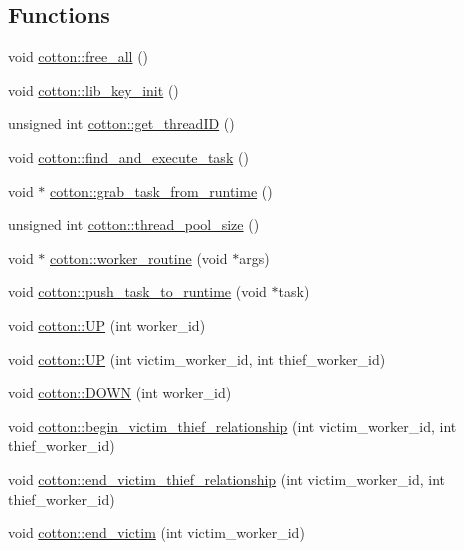 \subsection*{Functions}
\begin{DoxyCompactItemize}
\item 
void \mbox{\hyperlink{cotton-runtime_8h_ad169fe95f5f03bdfa569dd365dde6c12}{cotton\+::free\+\_\+all}} ()
\item 
void \mbox{\hyperlink{cotton-runtime_8h_a4ea9036584fa3bd86fe8626dc05d295f}{cotton\+::lib\+\_\+key\+\_\+init}} ()
\item 
unsigned int \mbox{\hyperlink{cotton-runtime_8h_ab1ebe1f6821a54e7c4911c22acebff8a}{cotton\+::get\+\_\+thread\+ID}} ()
\item 
void \mbox{\hyperlink{cotton-runtime_8h_af22caee9434a7e06a09b2f9a0417c1eb}{cotton\+::find\+\_\+and\+\_\+execute\+\_\+task}} ()
\item 
void $\ast$ \mbox{\hyperlink{cotton-runtime_8h_a1cae25b77bd884fcdcf2532663056d22}{cotton\+::grab\+\_\+task\+\_\+from\+\_\+runtime}} ()
\item 
unsigned int \mbox{\hyperlink{cotton-runtime_8h_a0b32dd3b6a3d126e107d5c77ec1f4cc3}{cotton\+::thread\+\_\+pool\+\_\+size}} ()
\item 
void $\ast$ \mbox{\hyperlink{cotton-runtime_8h_a361c34063ecb68cf02d417074decb12b}{cotton\+::worker\+\_\+routine}} (void $\ast$args)
\item 
void \mbox{\hyperlink{cotton-runtime_8h_a803285410d295a5f32238ad2dfc241a5}{cotton\+::push\+\_\+task\+\_\+to\+\_\+runtime}} (void $\ast$task)
\item 
void \mbox{\hyperlink{cotton-runtime_8h_ae91d8cfb1b831a971eafccb512c17a15}{cotton\+::\+UP}} (int worker\+\_\+id)
\item 
void \mbox{\hyperlink{cotton-runtime_8h_a7ed5b064cd66a53e2f01dc2c18c7e8d5}{cotton\+::\+UP}} (int victim\+\_\+worker\+\_\+id, int thief\+\_\+worker\+\_\+id)
\item 
void \mbox{\hyperlink{cotton-runtime_8h_a522a9376ec51306eab1724b2a9a1cf93}{cotton\+::\+D\+O\+WN}} (int worker\+\_\+id)
\item 
void \mbox{\hyperlink{cotton-runtime_8h_af567cb17aa6a653d9a567fb65f40b716}{cotton\+::begin\+\_\+victim\+\_\+thief\+\_\+relationship}} (int victim\+\_\+worker\+\_\+id, int thief\+\_\+worker\+\_\+id)
\item 
void \mbox{\hyperlink{cotton-runtime_8h_a2faa5f098d14f1a3319101ff735bf016}{cotton\+::end\+\_\+victim\+\_\+thief\+\_\+relationship}} (int victim\+\_\+worker\+\_\+id, int thief\+\_\+worker\+\_\+id)
\item 
void \mbox{\hyperlink{cotton-runtime_8h_a824fc414cfcf95d0d928f9736490ab41}{cotton\+::end\+\_\+victim}} (int victim\+\_\+worker\+\_\+id)
\end{DoxyCompactItemize}
